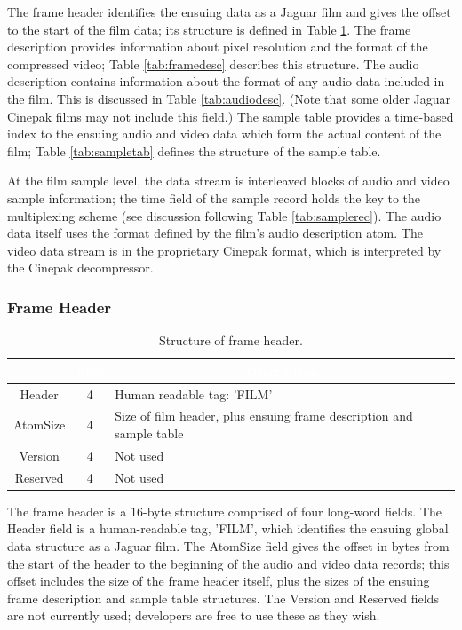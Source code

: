 \documentclass[12pt,letterpaper,twoside]{article}
\newcommand{\tabheadtxt}[1]{\multicolumn{1}{c}{\textcolor{white}{\textbf{#1}}}}
\begin{document}
The frame header identifies the ensuing data as a Jaguar film and gives the offset to the start of the film data; its structure is defined in Table \ref{tab:framehead}. The frame description provides information about pixel resolution and the format of the compressed video; Table \ref{tab:framedesc} describes this structure. The audio description contains information about the format of any audio data included in the film. This is discussed in Table \ref{tab:audiodesc}. (Note that some older Jaguar Cinepak films may not include this field.) The sample table provides a time-based index to the ensuing audio and video data which form the actual content of the film; Table \ref{tab:sampletab} defines the structure of the sample table.

At the film sample level, the data stream is interleaved blocks of audio and video sample information; the time field of the sample record holds the key to the multiplexing scheme (see discussion following Table \ref{tab:samplerec}). The audio data itself uses the format defined by the film's audio description atom. The video data stream is in the proprietary Cinepak format, which is interpreted by the Cinepak decompressor.

\subsubsection{Frame Header}

\begin{table}[h]
\centering
\begin{tabular}{|c|c|p{10cm}|}
\hline
\rowcolor{black}
\tabheadtxt{Field} & \tabheadtxt{Size} & \tabheadtxt{Description} \\
\hline
Header & 4 & Human readable tag: 'FILM'\\
\hline
AtomSize & 4 & Size of film header, plus ensuing frame description and sample table\\
\hline
Version & 4 & Not used\\
\hline
Reserved & 4 & Not used\\
\hline
\end{tabular}
\caption{Structure of frame header.}
\label{tab:framehead}
\end{table}
\FloatBarrier

The frame header is a 16-byte structure comprised of four long-word fields. The Header field is a human-readable tag, 'FILM', which identifies the ensuing global data structure as a Jaguar film. The AtomSize field gives the offset in bytes from the start of the header to the beginning of the audio and video data records; this offset includes the size of the frame header itself, plus the sizes of the ensuing frame description and sample table structures. The Version and Reserved fields are not currently used; developers are free to use these as they wish.
\end{document}
